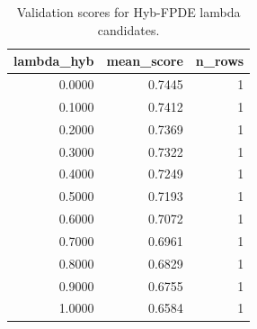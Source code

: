 \begin{table}[t]
\caption{Validation scores for Hyb-FPDE lambda candidates.}
\label{tab:lambda_distribution_computed}
\centering
\begin{tabular}{rrr}
\toprule
lambda\_hyb & mean\_score & n\_rows \\
\midrule
0.0000 & 0.7445 & 1 \\
0.1000 & 0.7412 & 1 \\
0.2000 & 0.7369 & 1 \\
0.3000 & 0.7322 & 1 \\
0.4000 & 0.7249 & 1 \\
0.5000 & 0.7193 & 1 \\
0.6000 & 0.7072 & 1 \\
0.7000 & 0.6961 & 1 \\
0.8000 & 0.6829 & 1 \\
0.9000 & 0.6755 & 1 \\
1.0000 & 0.6584 & 1 \\
\bottomrule
\end{tabular}

\end{table}
